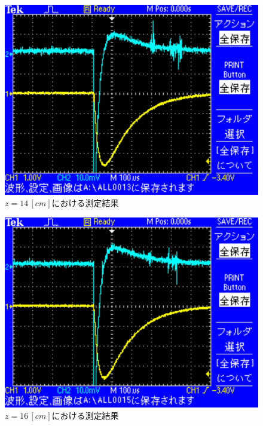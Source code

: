 \begin{figure}[H]
    \centering
    \includegraphics[scale=0.5]{images-8.pdf}
    \caption{$z=14\,[cm]$における測定結果}
\end{figure}

\begin{figure}[H]
    \centering
    \includegraphics[scale=0.5]{images-9.pdf}
    \caption{$z=16\,[cm]$における測定結果}
\end{figure}

